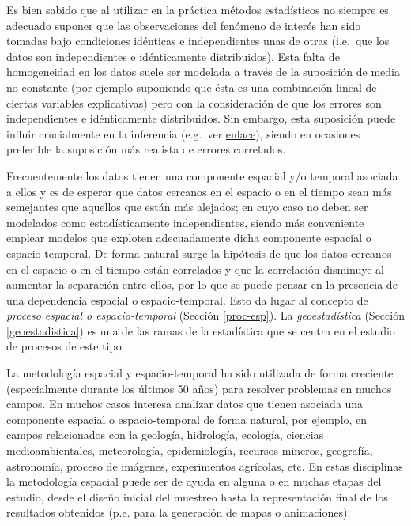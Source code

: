 \documentclass[
  spanish,
]{book}
\theoremstyle{break}
\theoremstyle{definition}
\theoremstyle{definition}
\theoremstyle{definition}
\theoremstyle{definition}
\theoremstyle{remark}
\begin{document}
Es bien sabido que al utilizar en la práctica métodos estadísticos no siempre es adecuado suponer que las observaciones del fenómeno de interés han sido tomadas bajo condiciones idénticas e independientes unas de otras (i.e.~que los datos son independientes e idénticamente distribuidos).
Esta falta de homogeneidad en los datos suele ser modelada a través de la suposición de media no constante (por ejemplo suponiendo que ésta es una combinación lineal de ciertas variables explicativas) pero con la consideración de que los errores son independientes e idénticamente distribuidos.
Sin embargo, esta suposición puede influir crucialmente en la inferencia (e.g.~ver \href{https://rubenfcasal.github.io/post/diagnosis-de-la-independencia/}{enlace}), siendo en ocasiones preferible la suposición más realista de errores correlados.

Frecuentemente los datos tienen una componente espacial y/o temporal asociada a ellos y es de esperar que datos cercanos en el espacio o en el tiempo sean más semejantes que aquellos que están más alejados; en cuyo caso no deben ser modelados como estadísticamente independientes, siendo más conveniente emplear modelos que exploten adecuadamente dicha componente espacial o espacio-temporal.
De forma natural surge la hipótesis de que los datos cercanos en el espacio o en el tiempo están correlados y que la correlación disminuye al aumentar la separación entre ellos, por lo que se puede pensar en la presencia de una dependencia espacial o espacio-temporal.
Esto da lugar al concepto de \emph{proceso espacial o espacio-temporal} (Sección \ref{proc-esp}).
La \emph{geoestadística} (Sección \ref{geoestadistica}) es una de las ramas de la estadística que se centra en el estudio de procesos de este tipo.

La metodología espacial y espacio-temporal ha sido utilizada de forma creciente (especialmente durante los últimos 50 años) para resolver problemas en muchos campos.
En muchos casos interesa analizar datos que tienen asociada una componente espacial o espacio-temporal de forma natural, por ejemplo, en campos relacionados con la geología, hidrología, ecología, ciencias medioambientales, meteorología, epidemiología, recursos mineros, geografía, astronomía, proceso de imágenes, experimentos agrícolas, etc.
En estas disciplinas la metodología espacial puede ser de ayuda en alguna o en muchas etapas del estudio, desde el diseño inicial del muestreo hasta la representación final de los resultados obtenidos (p.e. para la generación de mapas o animaciones).
\end{document}
